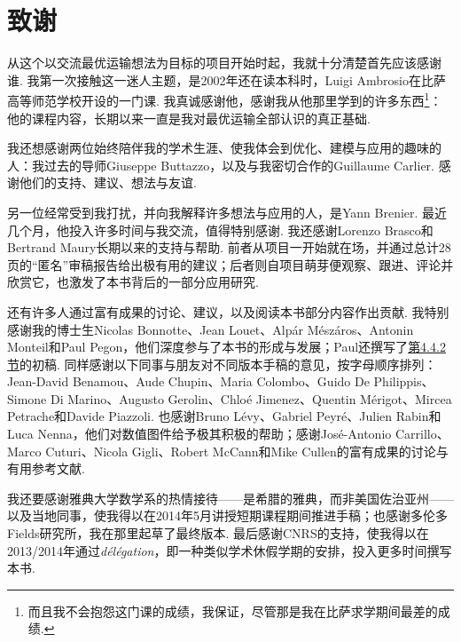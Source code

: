 \clearpage\section*{致谢}\label{sec:acknowledgments}
从这个以交流最优运输想法为目标的项目开始时起，我就十分清楚首先应该感谢谁. 我第一次接触这一迷人主题，是2002年还在读本科时，Luigi Ambrosio在比萨高等师范学校开设的一门课. 我真诚感谢他，感谢我从他那里学到的许多东西\footnote{而且我不会抱怨这门课的成绩，我保证，尽管那是我在比萨求学期间最差的成绩.}：他的课程内容，长期以来一直是我对最优运输全部认识的真正基础.

我还想感谢两位始终陪伴我的学术生涯、使我体会到优化、建模与应用的趣味的人：我过去的导师Giuseppe Buttazzo，以及与我密切合作的Guillaume Carlier. 感谢他们的支持、建议、想法与友谊.

另一位经常受到我打扰，并向我解释许多想法与应用的人，是Yann Brenier. 最近几个月，他投入许多时间与我交流，值得特别感谢. 我还感谢Lorenzo Brasco和Bertrand Maury长期以来的支持与帮助. 前者从项目一开始就在场，并通过总计28页的“匿名”审稿报告给出极有用的建议；后者则自项目萌芽便观察、跟进、评论并欣赏它，也激发了本书背后的一部分应用研究.

还有许多人通过富有成果的讨论、建议，以及阅读本书部分内容作出贡献. 我特别感谢我的博士生Nicolas Bonnotte、Jean Louet、Alpár Mészáros、Antonin Monteil和Paul Pegon，他们深度参与了本书的形成与发展；Paul还撰写了\hyperref[sec:4.4.2]{第4.4.2节}的初稿. 同样感谢以下同事与朋友对不同版本手稿的意见，按字母顺序排列：Jean-David Benamou、Aude Chupin、Maria Colombo、Guido De Philippis、Simone Di Marino、Augusto Gerolin、Chloé Jimenez、Quentin Mérigot、Mircea Petrache和Davide Piazzoli. 也感谢Bruno Lévy、Gabriel Peyré、Julien Rabin和Luca Nenna，他们对数值图件给予极其积极的帮助；感谢José-Antonio Carrillo、Marco Cuturi、Nicola Gigli、Robert McCann和Mike Cullen的富有成果的讨论与有用参考文献.

我还要感谢雅典大学数学系的热情接待——是希腊的雅典，而非美国佐治亚州——以及当地同事，使我得以在2014年5月讲授短期课程期间推进手稿；也感谢多伦多Fields研究所，我在那里起草了最终版本. 最后感谢CNRS的支持，使我得以在2013/2014年通过\textit{délégation}，即一种类似学术休假学期的安排，投入更多时间撰写本书.
